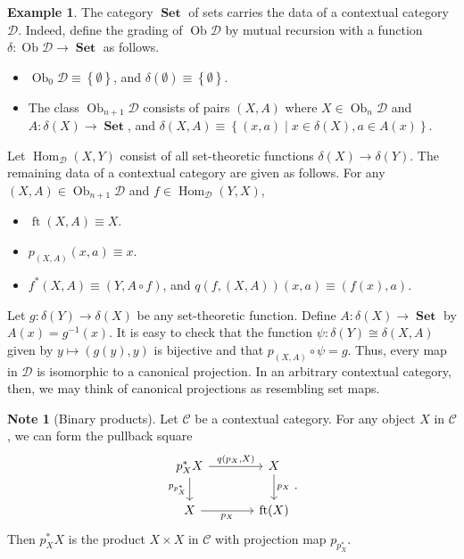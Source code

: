 \documentclass[10pt,letterpaper,cm]{nupset}
\theoremstyle{definition}
\newtheorem{exmp}[definition]{Example}
\newtheorem{note}[definition]{Note}
\theoremstyle{theorem}
\theoremstyle{remark}
\DeclareMathOperator{\ft}{ft}
\DeclareMathOperator{\ob}{Ob}
\newcommand{\0}{\mathbf{0}}
\newcommand{\1}{\mathbf{1}}
\newcommand{\2}{\mathbf{2}}
\DeclareMathOperator{\set}{\mathbf{Set}}
\renewcommand{\c}{\mathscr{C}}
\renewcommand{\d}{\mathscr{D}}
\DeclareMathOperator{\Hom}{Hom}
\newcommand{\bi}{\begin{itemize}}
\newcommand{\ei}{\end{itemize}}
\begin{document}
\begin{exmp}
The category $\set$ of sets carries the data of a contextual category $\d$. Indeed, define the grading of $\ob{\d}$ by mutual recursion with a function $\delta : \ob{\d} \to \set$ as follows.
\bi
\item $\ob_0{\d}\equiv \left\{\emptyset\right\}$, and $\delta(\emptyset)\equiv \left\{\emptyset\right\}$.
\item The class $\ob_{n+1}{\d}$ consists of pairs $\left(X,A\right)$ where $X\in \ob_n{\d}$ and $A: \delta(X)\to \set$, and $\delta(X,A) \equiv \left\{\left(x,a\right) \mid x\in \delta(X), a\in A(x)\right\}$.
\ei
Let $\Hom_{\d}(X, Y)$ consist of all set-theoretic functions $\delta(X) \to \delta(Y)$. The remaining data of a contextual category are given as follows. For any $\left(X,A\right) \in \ob_{n+1}{\d}$ and $f \in \Hom_{\d}(Y,X)$,
\bi
\item $\ft(X, A) \equiv X$.
\item $p_{\left(X, A\right)}(x,a) \equiv x$.
\item $f^{\ast}(X,A) \equiv \left(Y, A \circ f\right)$, and $q(f, \left(X, A\right))(x,a)\equiv \left(f(x), a\right)$.
\ei
Let $g: \delta(Y) \to \delta(X)$ be any set-theoretic function. Define $A: \delta(X) \to \set$ by $A(x) =g^{-1}(x)$. It is easy to check that the function $\psi : \delta(Y) \cong \delta(X,A)$ given by $y \mapsto \left(g(y), y\right)$ is bijective and that $p_{\left(X,A\right)} \circ \psi = g$. Thus, every map in $\d$ is isomorphic to a canonical projection. In an arbitrary contextual category, then, we may think of canonical projections as resembling set maps.
\end{exmp}

\begin{note}[Binary products]
Let $\c$ be a contextual category. For any object $X$ in $\c$, we can form the pullback square 
\[
\begin{tikzcd}[column sep=large]
p_X^{\ast}{X} \arrow[d, "p_{p_X^{\ast}}"'] \arrow[r, "{q(p_X, X)}"] & X \arrow[d, "p_X"] \\
X \arrow[r, "p_X"']                                                 & \ft(X)            
\end{tikzcd}
.\] Then $p_X^{\ast}{X}$ is the product $X\times X$ in $\c$ with projection map $p_{p_X^{\ast}}$.
\end{note}
\end{document}
